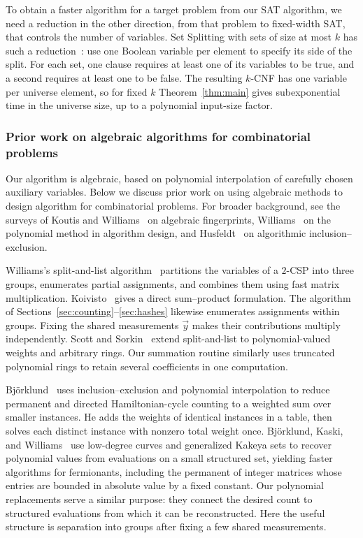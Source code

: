 \documentclass[11pt,reqno]{amsart}
\numberwithin{equation}{section}
\theoremstyle{definition}\newtheorem{definition}[theorem]{Definition}
\theoremstyle{remark}\newtheorem{remark}[theorem]{Remark}
\begin{document}
To obtain a faster algorithm for a target problem from our SAT algorithm,
we need a reduction in the other direction, from that problem to
fixed-width SAT, that controls the number of variables. Set Splitting
with sets of size at most $k$ has such a
reduction~\cite[Observation~3.6]{CDL16}: use one Boolean variable per
element to specify its side of the split. For each set, one clause
requires at least one of its variables to be true, and a second requires
at least one to be false. The resulting $k$-CNF has one variable per
universe element, so for fixed $k$ Theorem~\ref{thm:main} gives
subexponential time in the universe size, up to a polynomial input-size
factor.

\subsubsection{Prior work on algebraic algorithms for combinatorial problems}\label{subsec:related-algebraic}
Our algorithm is algebraic, based on polynomial interpolation of carefully chosen auxiliary variables. Below we discuss prior work on using algebraic methods to design algorithm for combinatorial problems. For broader background, see the surveys of Koutis and
Williams~\cite{KW16} on algebraic fingerprints, Williams~\cite{Wil14}
on the polynomial method in algorithm design, and
Husfeldt~\cite{Hus11} on algorithmic inclusion--exclusion.

Williams's split-and-list algorithm~\cite{Wil05} partitions the
variables of a $2$-CSP into three groups, enumerates partial assignments,
and combines them using fast matrix multiplication.
Koivisto~\cite{Koi06} gives a direct sum--product formulation.
The algorithm of Sections~\ref{sec:counting}--\ref{sec:hashes}
likewise enumerates assignments within groups. Fixing
the shared measurements $\vec y$ makes their contributions multiply
independently. Scott and Sorkin~\cite[Section~6]{SS09} extend
split-and-list to polynomial-valued weights and arbitrary rings.
Our summation routine similarly uses truncated polynomial rings to
retain several coefficients in one computation.

Bj\"orklund~\cite[Sections~2--3]{Bjo16} uses inclusion--exclusion and
polynomial interpolation to reduce permanent and directed
Hamiltonian-cycle counting to a weighted sum over smaller instances.
He adds the weights of identical instances in a table, then solves each
distinct instance with nonzero total weight once.
Bj\"orklund, Kaski, and Williams~\cite{BKW19} use
low-degree curves and generalized Kakeya sets to recover polynomial
values from evaluations on a small structured set, yielding faster
algorithms for fermionants, including the permanent of integer matrices whose entries are bounded in absolute value by a fixed constant.
Our polynomial replacements serve a similar purpose: they connect
the desired count to structured evaluations from which it can be
reconstructed. Here the useful structure is separation into groups
after fixing a few shared measurements.
\end{document}
